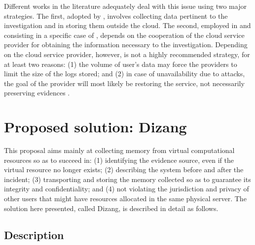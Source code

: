 \documentclass[conference]{IEEEtran}
\newcommand{\fancyname}{Dizang }
\begin{document}
Different works in the literature adequately deal with this issue using two major strategies.
%
The first, adopted by \cite{Reichert_Auto_acquisition:2015,George_DF2CE:2012,Poisel_VMI:2013,Dykstra_FROST:2013}, involves collecting data pertinent to the investigation and in storing them outside the cloud.
%
The second, employed in \cite{Sang_Log_approach:2013} and consisting in a specific case of \cite{George_DF2CE:2012}, depends on the cooperation of the cloud service provider for obtaining the information necessary to the investigation. 
%
Depending on the cloud service provider, however, is not a highly recommended strategy, for at least two reasons: 
(1) the volume of user's data may force the providers to limit the size of the logs stored; and 
(2) in case of unavailability due to attacks, the goal of the provider will most likely be restoring the service, not necessarily preserving evidences \cite{Clarke_Review_of_Challenges:2015}. 


\section{Proposed solution: \fancyname}
\label{sec:proposal}

This proposal aims mainly at collecting memory from virtual computational resources so as to succeed in: 
(1) identifying the evidence source, even if the virtual resource no longer exists; 
(2) describing the system before and after the incident;
(3) transporting and storing the memory collected so as to guarantee its integrity and confidentiality; and
(4) not violating the jurisdiction and privacy of other users that might have resources allocated in the same physical server.
%
The solution here presented, called Dizang, is described in detail as follows.


\subsection{Description}
\label{sec:proposal-desc}
\end{document}

